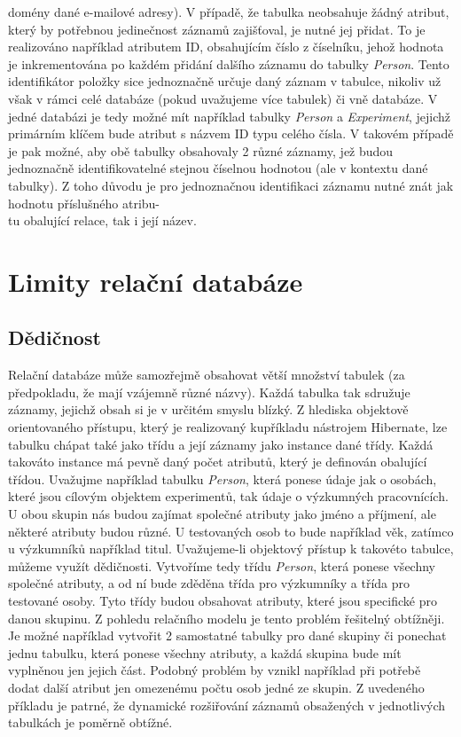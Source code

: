 \documentclass{projekt}
\begin{document}
domény dané e-mailové adresy). V případě, že tabulka neobsahuje žádný atribut, který by potřebnou jedinečnost záznamů zajišťoval, je nutné jej přidat. To je realizováno například atributem ID, obsahujícím číslo z číselníku, jehož hodnota je inkrementována po každém přidání dalšího záznamu do tabulky {\it Person}. Tento identifikátor položky sice jednoznačně určuje daný záznam v tabulce, nikoliv už však v rámci celé databáze (pokud uvažujeme více tabulek) či vně databáze. V jedné databázi je tedy možné mít například tabulky {\it Person} a {\it Experiment}, jejichž primárním klíčem bude atribut s názvem ID typu celého čísla. V takovém případě je pak možné, aby obě tabulky obsahovaly 2 různé záznamy, jež budou jednoznačně identifikovatelné stejnou číselnou hodnotou (ale v kontextu dané tabulky). Z toho důvodu je pro jednoznačnou identifikaci záznamu nutné znát jak hodnotu příslušného atribu-\\tu obalující relace, tak i její název. 


\section{Limity relační databáze}

\subsection{Dědičnost}


\hspace{0.65cm}Relační databáze může samozřejmě obsahovat větší množství tabulek (za předpokladu, že mají vzájemně různé názvy). Každá tabulka tak sdružuje záznamy, jejichž obsah si je v určitém smyslu blízký. Z hlediska objektově orientovaného přístupu, který je realizovaný kupříkladu nástrojem Hibernate, lze tabulku chápat také jako třídu a její záznamy jako instance dané třídy. Každá takováto instance má pevně daný počet atributů, který je definován obalující třídou. Uvažujme například tabulku {\it Person}, která ponese údaje jak o osobách, které jsou cílovým objektem experimentů, tak údaje o výzkumných pracovnících. U obou skupin nás budou zajímat společné atributy jako jméno a příjmení, ale některé atributy budou různé. U testovaných osob to bude například věk, zatímco u výzkumníků například titul. Uvažujeme-li objektový přístup k takovéto tabulce, můžeme využít dědičnosti. Vytvoříme tedy třídu {\it Person}, která ponese všechny společné atributy, a od ní bude zděděna třída pro výzkumníky a třída pro testované osoby. Tyto třídy budou obsahovat atributy, které jsou specifické pro danou skupinu. Z pohledu relačního modelu je tento problém řešitelný obtížněji. Je možné například vytvořit 2 samostatné tabulky pro dané skupiny či ponechat jednu tabulku, která ponese všechny atributy, a každá skupina bude mít vyplněnou jen jejich část. Podobný problém by vznikl například při potřebě dodat další atribut jen omezenému počtu osob jedné ze skupin. Z uvedeného příkladu je patrné, že dynamické rozšiřování záznamů obsažených v jednotlivých tabulkách je poměrně obtížné.
\end{document}
